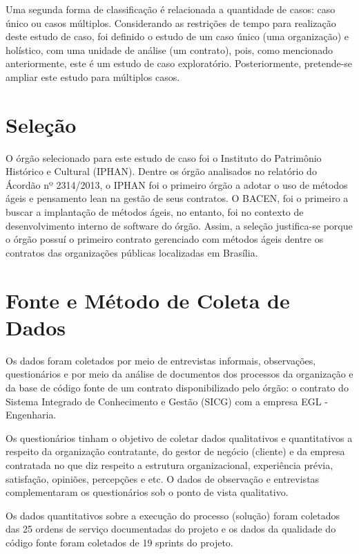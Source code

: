 Uma segunda forma de classificação é relacionada a quantidade de casos: caso único ou casos múltiplos. Considerando as restrições de tempo para realização deste estudo de caso, foi definido o estudo de um caso único (uma organização) e holístico, com uma unidade de análise (um contrato), pois, como mencionado anteriormente, este é um estudo de caso exploratório. Posteriormente, pretende-se ampliar este estudo para múltiplos casos.   

\section[Seleção]{Seleção}

O órgão selecionado para este estudo de caso foi o Instituto do Patrimônio Histórico e Cultural (IPHAN). Dentre os órgão analisados no relatório do Ácordão nº 2314/2013, o IPHAN foi o primeiro órgão a adotar o uso de métodos ágeis e pensamento lean na gestão de seus contratos. O BACEN, foi o primeiro a buscar a implantação de métodos ágeis, no entanto, foi no contexto de desenvolvimento interno de software do órgão. Assim, a seleção justifica-se porque o órgão possuí o primeiro contrato gerenciado com métodos ágeis dentre os contratos das organizações públicas localizadas em Brasília.

\section[Fonte e Método Coleta de Dados]{Fonte e Método de Coleta de Dados}

Os dados foram coletados por meio de entrevistas informais, observações, questionários e por meio da análise de documentos dos processos da organização e da base de código fonte de um contrato disponibilizado pelo órgão: o contrato do Sistema Integrado de Conhecimento e Gestão (SICG) com a empresa EGL - Engenharia.

Os questionários tinham o objetivo de coletar dados qualitativos e quantitativos a respeito da organização contratante, do gestor de negócio (cliente) e da empresa contratada no que diz respeito a estrutura organizacional, experiência prévia, satisfação, opiniões, percepções e etc. O dados de observação e entrevistas complementaram os questionários sob o ponto de vista qualitativo.

Os dados quantitativos sobre a execução do processo (solução) foram coletados das 25 ordens de serviço documentadas do projeto e os dados da qualidade do código fonte foram coletados de 19 sprints do projeto.

